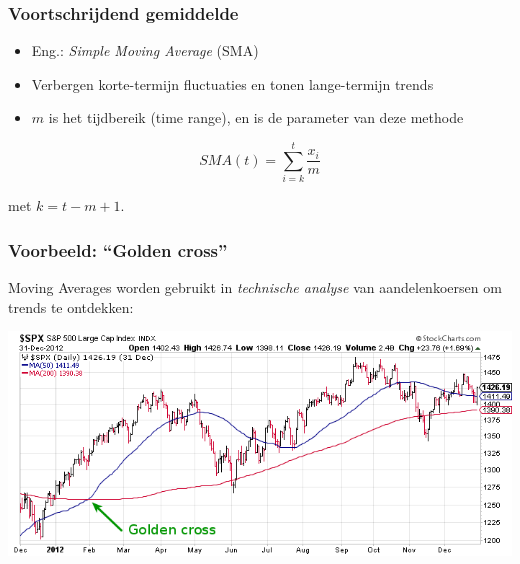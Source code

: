\documentclass[aspectratio=169]{beamer}
\begin{document}
\begin{frame}
  \frametitle{Voortschrijdend gemiddelde}


  \small

  \begin{itemize}
    \item Eng.: \emph{Simple Moving Average} (SMA)
    \item Verbergen korte-termijn fluctuaties en tonen lange-termijn trends
    \item $m$ is het tijdbereik (time range), en is de parameter van deze methode
  \end{itemize}

  \begin{equation}
    SMA(t) = \sum_{i=k}^{t} \frac{x_{i}}{m}
    \label{eq:movingAverage}
  \end{equation}

  met $k = t - m + 1$.
\end{frame}

\begin{frame}
  \frametitle{Voorbeeld: ``Golden cross''}

  Moving Averages worden gebruikt in \emph{technische analyse} van aandelenkoersen om trends te ontdekken:

  \begin{center}
    \includegraphics[width=\textwidth]{img/tijdreeks-golden-cross}
  \end{center}
\end{frame}
\end{document}
